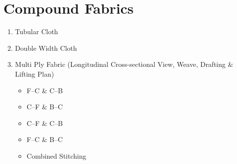 \section{Compound Fabrics}

\begin{enumerate}[label=\textbf{\Alph*.}]
    \item Tubular Cloth
    \item Double Width Cloth
    \item Multi Ply Fabric (Longitudinal Cross-sectional View, Weave, Drafting \& Lifting Plan)
    \begin{itemize}
        \item F--C \& C--B
        \item C--F \& B--C
        \item C--F \& C--B
        \item F--C \& B--C
        \item Combined Stitching
    \end{itemize}
\end{enumerate}
